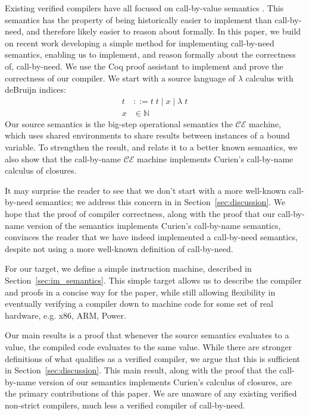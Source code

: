 Existing verified compilers have all focused on call-by-value semantics
\cite{chlipala2007certified, leroy2012compcert, cakeml14}. This semantics has
the property of being historically easier to implement than call-by-need, and
therefore likely easier to reason about formally. In this paper, we build on
recent work developing a simple method for implementing call-by-need semantics,
enabling us to implement, and reason formally about the correctness of,
call-by-need. We use the Coq proof assistant \cite{barras1997coq} to implement
and prove the correctness of our compiler. We start with a source language of
$\lambda$ calculus with deBruijn indices:
\begin{align*}
 t &::= t \; t \; | \; x \; | \;  \lambda \; t \\
 x &\in \mathbb{N}
\end{align*}
Our source semantics is the big-step operational semantics the $\mathcal{CE}$
machine, which uses shared environments to share results between instances of a
bound variable. To strengthen the result, and relate it to a better known
semantics, we also show that the call-by-name $\mathcal{CE}$ machine implements
Curien's call-by-name calculus of closures. 

It may surprise the reader to see that we don't start with a more well-known
call-by-need semantics; we address this concern in in
Section~\ref{sec:discussion}.  We hope that the proof of compiler correctness,
along with the proof that our call-by-name version of the semantics implements
Curien's call-by-name semantics, convinces the reader that we have indeed
implemented a call-by-need semantics, despite not using a more well-known
definition of call-by-need. 

For our target, we define a simple instruction machine, described in
Section~\ref{sec:im_semantics}. This simple target allows us to describe the
compiler and proofs in a concise way for the paper, while still allowing
flexibility in eventually verifying a compiler down to machine code for some
set of real hardware, e.g. x86, ARM, Power. 

Our main results is a proof that whenever the source semantics evaluates to a
value, the compiled code evaluates to the same value. While there are stronger
definitions of what qualifies as a verified compiler, we argue that this is
sufficient in Section~\ref{sec:discussion}. This main result, along with the
proof that the call-by-name version of our semantics implements Curien's
calculus of closures, are the primary contributions of this paper. We are
unaware of any existing verified non-strict compilers, much less a verified
compiler of call-by-need. 

